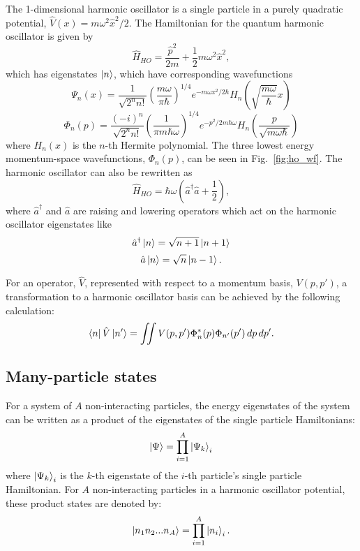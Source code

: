 The 1-dimensional harmonic oscillator is a single particle in a purely quadratic potential, $\hat{V}(x) = m\omega^2 \hat{x}^2/2$. The Hamiltonian for the quantum harmonic oscillator is given by
\begin{equation}
\hat{H}_{HO} = \frac{\hat{p}^2}{2m} + \frac{1}{2}m\omega^2\hat{x}^2,
\end{equation}
which has eigenstates $\ket{n}$, which have corresponding wavefunctions
\begin{equation}
\Psi_n(x) = \frac{1}{\sqrt{2^n n!}}\left(\frac{m \omega}{\pi \hbar}\right)^{1/4}e^{-m \omega x^2 / 2 \hbar} H_n\left(\sqrt{\frac{m \omega}{\hbar}}x\right)
\end{equation}
\begin{equation}
\Phi_n(p) = \frac{(-i)^n}{\sqrt{2^n n!}}\left(\frac{1}{\pi m \hbar \omega}\right)^{1/4}e^{-p^2 / 2 m \hbar \omega} H_n\left(\frac{p}{\sqrt{m \omega \hbar}}\right)
\end{equation}
where $H_n(x)$ is the $n$-th Hermite polynomial. The three lowest energy momentum-space wavefunctions, $\Phi_n(p)$, can be seen in Fig.~\ref{fig:ho_wf}. The harmonic oscillator can also be rewritten as
\begin{equation}
\hat{H}_{HO} = \hbar \omega \left(\hat{a}^\dagger \hat{a} + \frac{1}{2}\right),
\end{equation}
where $\hat{a}^\dagger$ and $\hat{a}$ are raising and lowering operators which act on the harmonic oscillator eigenstates like
\begin{equation}
\hat{a}^\dagger\ket{n} = \sqrt{n + 1}\ket{n+1}
\end{equation}
\begin{equation}
\hat{a}\ket{n} = \sqrt{n}\ket{n-1}.
\end{equation}

For an operator, $\hat{V}$, represented with respect to a momentum basis, $V(p, p')$, a transformation to a harmonic oscillator basis can be achieved by the following calculation:
\begin{equation}\label{eq:ho_transform}
\bra{n}\hat{V}\ket{n'} = \iint V(p, p') \Phi_n^*(p) \Phi_{n'}(p') \,dp\,dp'.
\end{equation}

\subsection{Many-particle states}

For a system of $A$ non-interacting particles, the energy eigenstates of the system can be written as a product of the eigenstates of the single particle Hamiltonians:
\begin{equation}
\ket{\Psi} = \prod_{i=1}^{A}\ket{\Psi_k}_i
\end{equation}
where $\ket{\Psi_k}_i$ is the $k$-th eigenstate of the $i$-th particle's single particle Hamiltonian. For $A$ non-interacting particles in a harmonic oscillator potential, these product states are denoted by:
\begin{equation}
\ket{n_1 n_2 ... n_A} = \prod_{i=1}^{A}\ket{n_i}_i.
\end{equation}


